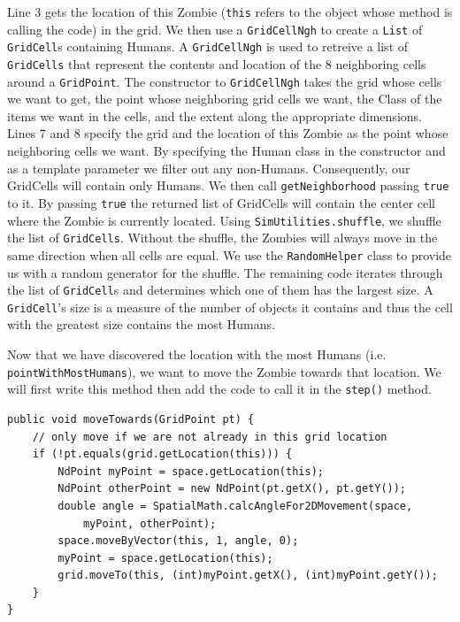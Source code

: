 \documentclass[11pt]{amsart}
\begin{document}
Line 3 gets the location of this Zombie (\texttt{this} refers to the object whose method is calling the code) in the grid. We then use a \texttt{GridCellNgh} to create a \texttt{List} of \texttt{GridCell}s containing Humans. A  \texttt{GridCellNgh} is used to retreive a list of \texttt{GridCells} that represent the contents and location of the 8 neighboring cells around a \texttt{GridPoint}. The constructor to \texttt{GridCellNgh} takes the grid whose cells we want to get, the point whose neighboring grid cells we want, the Class of the items we want in the cells, and the extent along the appropriate dimensions. Lines 7 and 8 specify the grid and the location of this Zombie as the point whose neighboring cells we want. By specifying the Human class in the constructor and as a template parameter we filter out any non-Humans. Consequently, our GridCells will contain only Humans. We then call \texttt{getNeighborhood} passing \texttt{true} to it. By passing \texttt{true} the returned list of GridCells will contain the center cell where the Zombie is currently located. Using \texttt{SimUtilities.shuffle}, we shuffle the list of \texttt{GridCells}. Without the shuffle, the Zombies will always move in the same direction when all cells are equal. We use the \texttt{RandomHelper} class to provide us with a random generator for the shuffle. The remaining code iterates through the list of \texttt{GridCell}s and determines which one of them has the largest size. A \texttt{GridCell}'s size is a measure of the number of objects it contains and thus the cell with the greatest size contains the most Humans.

Now that we have discovered the location with the most Humans (i.e. \texttt{pointWithMostHumans}), we want to move the Zombie towards that location. We will first write this method then add the code to call it in the \texttt{step()} method.

\noindent\begin{minipage}[h]{\textwidth}
\vspace{.2in}
\lstset{language=java,caption=moveTowards Method}
\begin{lstlisting}
public void moveTowards(GridPoint pt) {
	// only move if we are not already in this grid location
	if (!pt.equals(grid.getLocation(this))) {
		NdPoint myPoint = space.getLocation(this);
		NdPoint otherPoint = new NdPoint(pt.getX(), pt.getY());
		double angle = SpatialMath.calcAngleFor2DMovement(space, 
			myPoint, otherPoint);
		space.moveByVector(this, 1, angle, 0);
		myPoint = space.getLocation(this);
		grid.moveTo(this, (int)myPoint.getX(), (int)myPoint.getY());
	}
}
\end{lstlisting}
\vspace{.2in}
\end{minipage}
\end{document}
